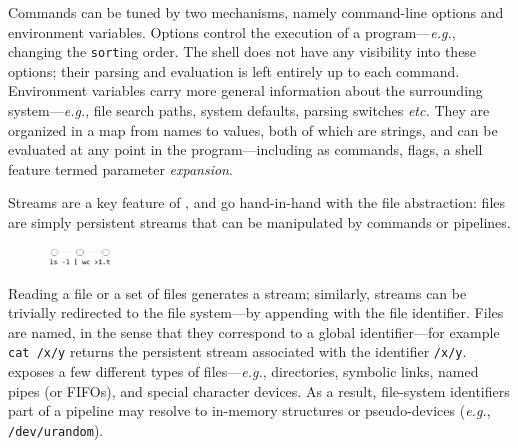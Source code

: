 \documentclass[sigplan,10pt,review,anonymous]{acmart}
\newcommand{\eg}{{\em e.g.}, }
\newcommand{\etc}{{\em etc.}\xspace}
\newcommand{\ttt}[1]{\texttt{\small #1}}
\begin{document}
Commands can be tuned by two mechanisms, namely command-line options and environment variables.
Options control the execution of a program---\eg changing the \ttt{sort}ing order.
The shell does not have any visibility into these options; 
  their parsing and evaluation is left entirely up to each command.
Environment variables carry more general information about the surrounding system---\eg file search paths, system defaults, parsing switches \etc 
They are organized in a map from names to values, both of which are strings, and can be evaluated at any point in the program---including as commands, flags, a shell feature termed parameter \emph{expansion}.

Streams are a key feature of \unix, and go hand-in-hand with the file abstraction:
  files are simply persistent streams that can be manipulated by commands or pipelines.
\begin{figure}
  \vspace{-15pt}
    \includegraphics[width=0.15\textwidth]{./figs/dish_ex3.pdf}
  \vspace{-25pt}
\end{figure}
Reading a file or a set of files generates a stream; 
  similarly, streams can be trivially redirected to the file system---by appending with the file identifier.
Files are named, in the sense that they correspond to a global identifier---for example \ttt{cat /x/y} returns the persistent stream associated with the identifier \ttt{/x/y}.
\unix exposes a few different types of files---\eg directories, symbolic links, named pipes (or FIFOs), and special character devices.
As a result, file-system identifiers part of a pipeline may resolve to in-memory structures or pseudo-devices (\eg \ttt{/dev/urandom}).

\end{document}
